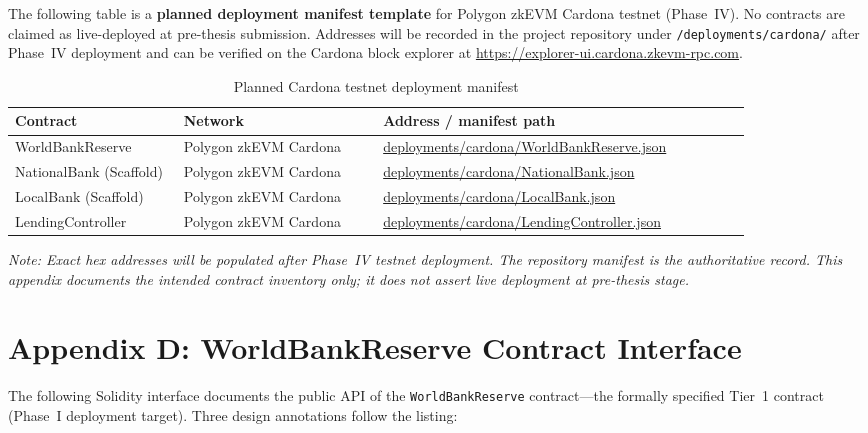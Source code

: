\documentclass[12pt, a4paper]{report}
\newcommand{\tableheadcolor}{\rowcolor{TableHeadBg}}
\newcommand{\tableheadfont}{\bfseries}
\begin{document}
The following table is a \textbf{planned deployment manifest template} for Polygon zkEVM Cardona testnet (Phase~IV). No contracts are claimed as live-deployed at pre-thesis submission. Addresses will be recorded in the project repository under \texttt{/deployments/cardona/} after Phase~IV deployment and can be verified on the Cardona block explorer at \url{https://explorer-ui.cardona.zkevm-rpc.com}.

\begin{table}[H]
\centering
\caption[Planned Cardona testnet deployment manifest]{Planned Cardona testnet deployment manifest}
\label{tab:cardona-manifest}
\begingroup
\footnotesize
\setlength{\tabcolsep}{4pt}
\renewcommand{\arraystretch}{1.15}
\begin{tabular}{@{}%
  >{\raggedright\arraybackslash}p{0.22\linewidth}%
  >{\raggedright\arraybackslash}p{0.26\linewidth}%
  >{\raggedright\arraybackslash}p{0.48\linewidth}@{}}
\toprule
\tableheadcolor
\tableheadfont Contract & \tableheadfont Network & \tableheadfont Address / manifest path \\
\midrule
WorldBankReserve & Polygon zkEVM Cardona & \url{deployments/cardona/WorldBankReserve.json} \\
\rowcolor{RowShade}
NationalBank (Scaffold) & Polygon zkEVM Cardona & \url{deployments/cardona/NationalBank.json} \\
LocalBank (Scaffold) & Polygon zkEVM Cardona & \url{deployments/cardona/LocalBank.json} \\
\rowcolor{RowShade}
LendingController & Polygon zkEVM Cardona & \url{deployments/cardona/LendingController.json} \\
\bottomrule
\end{tabular}
\endgroup
\end{table}

\noindent\textit{Note: Exact hex addresses will be populated after Phase~IV testnet deployment. The repository manifest is the authoritative record. This appendix documents the intended contract inventory only; it does not assert live deployment at pre-thesis stage.}

\chapter*{Appendix D: WorldBankReserve Contract Interface}
{}

The following Solidity interface documents the public API of the \texttt{WorldBankReserve} contract---the formally specified Tier~1 contract (Phase~I deployment target). Three design annotations follow the listing:
\end{document}
